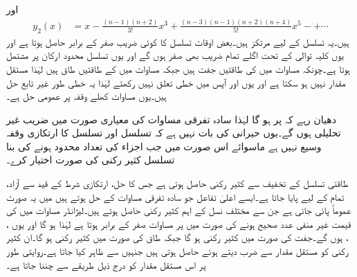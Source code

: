 اور
\begin{align}\label{مساوات_بیسل_حل_لیژانڈر_ب}
y_2(x)&=x-\frac{(n-1)(n+2)}{3!}x^3+\frac{(n-3)(n-1)(n+2)(n+4)}{5!}x^5-+\cdots
\end{align}
ہیں۔یہ تسلسل  کے لیے مرتکز ہیں۔بعض اوقات تسلسل کا کوئی  ضریب  صفر کے برابر حاصل ہوتا ہے اور یوں کلیہ توالی کے تحت اگلے تمام  ضریب  بھی صفر ہوں گے اور یوں تسلسل محدود ارکان پر مشتمل ہوتا ہے۔چونکہ مساوات  میں  کی طاقتیں  جفت  ہیں جبکہ مساوات  میں  کے طاقتیں طاق ہیں لہٰذا  مستقل مقدار نہیں ہو سکتا ہے اور یوں  اور  آپس میں خطی تعلق نہیں رکھتے لہٰذا یہ خطی طور غیر تابع حل ہیں۔یوں مساوات  کھلے وقفہ  پر عمومی حل ہے۔

دھیان رہے کہ  پر  ہو گا لہٰذا سادہ تفرقی مساوات کی معیاری صورت میں  ضریب  غیر تحلیلی ہوں گے۔یوں حیرانی کی بات نہیں ہے کہ تسلسل  اور تسلسل  کا ارتکازی وقفہ وسیع نہیں ہے ماسوائے اس صورت میں جب  اجزاء کی تعداد محدود ہونے کی بنا  تسلسل کثیر رکنی کی صورت اختیار کرے۔

طاقتی تسلسل کے تخفیف سے کثیر رکنی حاصل ہوتی ہے جس کا حل، ارتکازی شرط کے قید سے آزاد،  تمام  کے لیے پایا جاتا ہے۔ایسے اعلیٰ تفاعل جو سادہ تفرقی مساوات کے حل ہوتے ہیں میں یہ صورت عموماً پائی جاتی ہے جن سے مختلف نسل کے اہم کثیر رکنی حاصل ہوتے ہیں۔لیژانڈر مساوات میں  کی قیمت غیر منفی عدد صحیح ہونے کی صورت میں  پر مساوات  صفر کے برابر ہوتا ہے لہٰذا  ہو گا اور یوں ، ،  ہوں گے۔جفت  کی صورت میں  کثیر رکنی ہو گا جبکہ طاق  کی صورت میں  کثیر رکنی ہو گا۔ان کثیر رکنی کو مستقل مقدار سے ضرب دیتے ہوئے  حاصل ہوتی ہیں جنہیں  سے ظاہر کیا جاتا ہے۔روایتی طور پر اس مستقل مقدار کو درج ذیل طریقے سے چننا جاتا ہے۔

